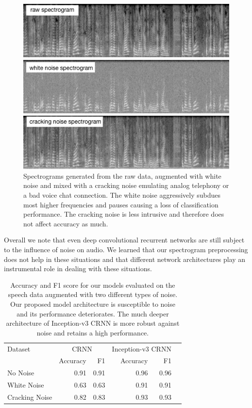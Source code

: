 	\begin{figure}[]
  		\centering
    	\includegraphics[width=\textwidth, keepaspectratio]{img/noise_spectrograms.png}
    	\caption{Spectrograms generated from the raw data, augmented with white noise and mixed with a cracking noise emulating analog telephony or a bad voice chat connection. The white noise aggressively subdues most higher frequencies and pauses causing a loss of classification performance. The cracking noise is less intrusive and therefore does not affect accuracy as much.}
    	\label{fig:noise}
	\end{figure}


Overall we note that even deep convolutional recurrent networks are still subject to the influence of noise on audio. We learned that our spectrogram preprocessing does not help in these situations and that different network architectures play an instrumental role in dealing with these situations.
 
	\begin{table}[]
	\centering
	\begin{tabularx}{\textwidth}{lrrrrr}
	\toprule
	Dataset & \multicolumn{2}{c}{CRNN} & \multicolumn{2}{c}{Inception-v3 CRNN} \\  
                & Accuracy  & F1    & Accuracy  & F1   \\ \midrule
No Noise		& 0.91		& 0.91	& 0.96		& 0.96 \\                
White Noise     & 0.63      & 0.63  & 0.91      & 0.91 \\
Cracking Noise  & 0.82      & 0.83  & 0.93      & 0.93 \\
 	\bottomrule
	\end{tabularx}
	\caption{Accuracy and F1 score for our models evaluated on the speech data augmented with two different types of noise. Our proposed model architecture is susceptible to noise and its performance deteriorates. The much deeper architecture of Inception-v3 CRNN is more robust against noise and retains a high performance.}
	\label{tab:noise}
	\end{table}



